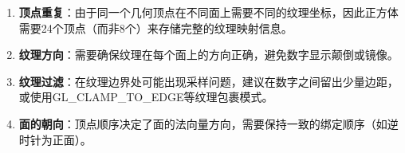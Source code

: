\documentclass[12pt,a4paper]{article}
\begin{document}
\begin{enumerate}
    \item \textbf{顶点重复}：由于同一个几何顶点在不同面上需要不同的纹理坐标，因此正方体需要24个顶点（而非8个）来存储完整的纹理映射信息。
    
    \item \textbf{纹理方向}：需要确保纹理在每个面上的方向正确，避免数字显示颠倒或镜像。
    
    \item \textbf{纹理过滤}：在纹理边界处可能出现采样问题，建议在数字之间留出少量边距，或使用GL\_CLAMP\_TO\_EDGE等纹理包裹模式。
    
    \item \textbf{面的朝向}：顶点顺序决定了面的法向量方向，需要保持一致的绑定顺序（如逆时针为正面）。
\end{enumerate}
\end{document}
